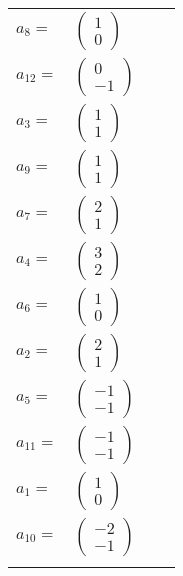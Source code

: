 \documentclass[1p]{elsarticle_modified}
\theoremstyle{definition}
\begin{document}
\begin{tabular}{m{7pt} m{180pt} m{7pt} m{180pt} }
\flushright $a_{8}=$&$\begin{pmatrix}1\\0\end{pmatrix}$ \\
\flushright $a_{12}=$&$\begin{pmatrix}0\\-1\end{pmatrix}$ \\
\flushright $a_{3}=$&$\begin{pmatrix}1\\1\end{pmatrix}$ \\
\flushright $a_{9}=$&$\begin{pmatrix}1\\1\end{pmatrix}$ \\
\flushright $a_{7}=$&$\begin{pmatrix}2\\1\end{pmatrix}$ \\
\flushright $a_{4}=$&$\begin{pmatrix}3\\2\end{pmatrix}$ \\
\flushright $a_{6}=$&$\begin{pmatrix}1\\0\end{pmatrix}$ \\
\flushright $a_{2}=$&$\begin{pmatrix}2\\1\end{pmatrix}$ \\
\flushright $a_{5}=$&$\begin{pmatrix}-1\\-1\end{pmatrix}$ \\
\flushright $a_{11}=$&$\begin{pmatrix}-1\\-1\end{pmatrix}$ \\
\flushright $a_{1}=$&$\begin{pmatrix}1\\0\end{pmatrix}$ \\
\flushright $a_{10}=$&$\begin{pmatrix}-2\\-1\end{pmatrix}$\\&\end{tabular}
\end{document}
